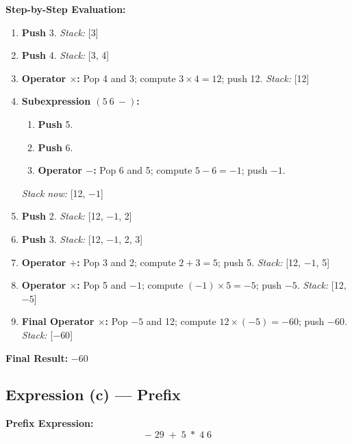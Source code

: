 \documentclass[12pt]{article}
\begin{document}
\textbf{Step-by-Step Evaluation:}
\begin{enumerate}[label=\textbf{Step \arabic*:}, leftmargin=*]
    \item \textbf{Push} 3. \quad \textit{Stack:} [3]
    \item \textbf{Push} 4. \quad \textit{Stack:} [3, 4]
    \item \textbf{Operator \(\times\):} Pop 4 and 3; compute \(3 \times 4 = 12\); push 12. \quad \textit{Stack:} [12]
    \item \textbf{Subexpression \((5\ 6\ -)\):} 
    \begin{enumerate}[label=\(\bullet\)]
        \item \textbf{Push} 5.
        \item \textbf{Push} 6.
        \item \textbf{Operator \(-\):} Pop 6 and 5; compute \(5-6=-1\); push \(-1\).
    \end{enumerate}
    \quad \textit{Stack now:} [12, \(-1\)]
    \item \textbf{Push} 2. \quad \textit{Stack:} [12, \(-1\), 2]
    \item \textbf{Push} 3. \quad \textit{Stack:} [12, \(-1\), 2, 3]
    \item \textbf{Operator \(+\):} Pop 3 and 2; compute \(2+3=5\); push 5. \quad \textit{Stack:} [12, \(-1\), 5]
    \item \textbf{Operator \(\times\):} Pop 5 and \(-1\); compute \((-1) \times 5 = -5\); push \(-5\). \quad \textit{Stack:} [12, \(-5\)]
    \item \textbf{Final Operator \(\times\):} Pop \(-5\) and 12; compute \(12 \times (-5) = -60\); push \(-60\). \quad \textit{Stack:} [\(-60\)]
\end{enumerate}

\textbf{Final Result:} \(\boxed{-60}\)

\newpage
\subsection*{Expression (c) --- Prefix}
\textbf{Prefix Expression:}
\[
- \;29\; +\; 5\; *\; 4\; 6
\]
\end{document}

